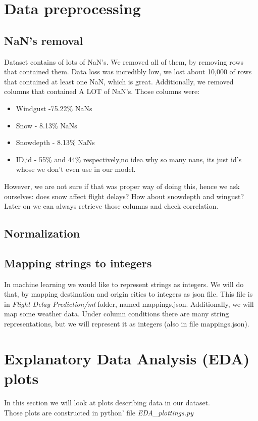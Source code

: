 \documentclass{article}
\begin{document}
\section{Data preprocessing}

\subsection{NaN's removal}
Dataset contains of lots of NaN's. We removed all of them, by removing rows that contained them. Data loss
was incredibly low, we lost about 10,000 of rows that contained at least one NaN, which is great. Additionally,
we removed columns that contained A LOT of NaN's. Those columns were:
	\begin{itemize}
		\item Windgust -75.22\% NaNs
		\item Snow - 8.13\% NaNs
		\item Snowdepth - 8.13\% NaNs
		\item ID,id - 55\% and 44\% respectively,no idea why so many nans, its just id's whose we don't even use in our model.
	\end{itemize}

However, we are not sure if that was proper way of doing this, hence we ask ourselves: does snow affect flight delays? How about snowdepth and wingust? Later on we can always retrieve those columns and check correlation.

\subsection{Normalization}


\subsection{Mapping strings to integers}
In machine learning we would like to represent strings as integers. We will do that, by mapping destination and origin cities to integers
as json file. This file is in \textit{Flight-Delay-Prediction/ml} folder, named mappings.json. Additionally, we will map some weather data. Under column conditions there are many string representations, but we will represent it as integers (also in file mappings.json).

\newpage
\section{Explanatory Data Analysis (EDA) plots}
In this section we will look at plots describing data in our dataset.\\
Those plots are constructed in python' file \textit{EDA\_plottings.py} 
	
\end{document}

